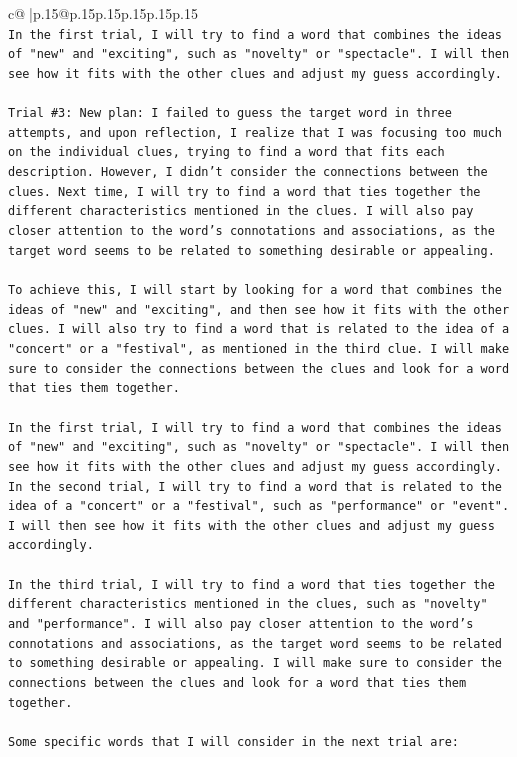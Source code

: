 \documentclass{article}
\begin{document}
{\begin{supertabular}{c@{$\;$}|p{.15\linewidth}@{}p{.15\linewidth}p{.15\linewidth}p{.15\linewidth}p{.15\linewidth}p{.15\linewidth}}
{{{\\ 
\texttt{In the first trial, I will try to find a word that combines the ideas of "new" and "exciting", such as "novelty" or "spectacle". I will then see how it fits with the other clues and adjust my guess accordingly.} \\
\\ 
\texttt{Trial \#3: New plan: I failed to guess the target word in three attempts, and upon reflection, I realize that I was focusing too much on the individual clues, trying to find a word that fits each description. However, I didn't consider the connections between the clues. Next time, I will try to find a word that ties together the different characteristics mentioned in the clues. I will also pay closer attention to the word's connotations and associations, as the target word seems to be related to something desirable or appealing.} \\
\\ 
\texttt{To achieve this, I will start by looking for a word that combines the ideas of "new" and "exciting", and then see how it fits with the other clues. I will also try to find a word that is related to the idea of a "concert" or a "festival", as mentioned in the third clue. I will make sure to consider the connections between the clues and look for a word that ties them together.} \\
\\ 
\texttt{In the first trial, I will try to find a word that combines the ideas of "new" and "exciting", such as "novelty" or "spectacle". I will then see how it fits with the other clues and adjust my guess accordingly. In the second trial, I will try to find a word that is related to the idea of a "concert" or a "festival", such as "performance" or "event". I will then see how it fits with the other clues and adjust my guess accordingly.} \\
\\ 
\texttt{In the third trial, I will try to find a word that ties together the different characteristics mentioned in the clues, such as "novelty" and "performance". I will also pay closer attention to the word's connotations and associations, as the target word seems to be related to something desirable or appealing. I will make sure to consider the connections between the clues and look for a word that ties them together.} \\
\\ 
\texttt{Some specific words that I will consider in the next trial are:} \\
}}}
\end{supertabular}}
\end{document}
